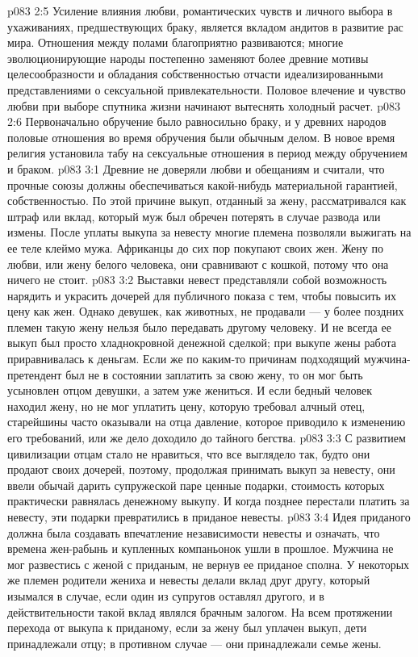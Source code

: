 \vs p083 2:5 Усиление влияния любви, романтических чувств и личного выбора в ухаживаниях, предшествующих браку, является вкладом андитов в развитие рас мира. Отношения между полами благоприятно развиваются; многие эволюционирующие народы постепенно заменяют более древние мотивы целесообразности и обладания собственностью отчасти идеализированными представлениями о сексуальной привлекательности. Половое влечение и чувство любви при выборе спутника жизни начинают вытеснять холодный расчет.
\vs p083 2:6 Первоначально обручение было равносильно браку, и у древних народов половые отношения во время обручения были обычным делом. В новое время религия установила табу на сексуальные отношения в период между обручением и браком.
\vs p083 3:1 Древние не доверяли любви и обещаниям и считали, что прочные союзы должны обеспечиваться какой\hyp{}нибудь материальной гарантией, собственностью. По этой причине выкуп, отданный за жену, рассматривался как штраф или вклад, который муж был обречен потерять в случае развода или измены. После уплаты выкупа за невесту многие племена позволяли выжигать на ее теле клеймо мужа. Африканцы до сих пор покупают своих жен. Жену по любви, или жену белого человека, они сравнивают с кошкой, потому что она ничего не стоит.
\vs p083 3:2 Выставки невест представляли собой возможность нарядить и украсить дочерей для публичного показа с тем, чтобы повысить их цену как жен. Однако девушек, как животных, не продавали --- у более поздних племен такую жену нельзя было передавать другому человеку. И не всегда ее выкуп был просто хладнокровной денежной сделкой; при выкупе жены работа приравнивалась к деньгам. Если же по каким\hyp{}то причинам подходящий мужчина\hyp{}претендент был не в состоянии заплатить за свою жену, то он мог быть усыновлен отцом девушки, а затем уже жениться. И если бедный человек находил жену, но не мог уплатить цену, которую требовал алчный отец, старейшины часто оказывали на отца давление, которое приводило к изменению его требований, или же дело доходило до тайного бегства.
\vs p083 3:3 С развитием цивилизации отцам стало не нравиться, что все выглядело так, будто они продают своих дочерей, поэтому, продолжая принимать выкуп за невесту, они ввели обычай дарить супружеской паре ценные подарки, стоимость которых практически равнялась денежному выкупу. И когда позднее перестали платить за невесту, эти подарки превратились в приданое невесты.
\vs p083 3:4 Идея приданого должна была создавать впечатление независимости невесты и означать, что времена жен\hyp{}рабынь и купленных компаньонок ушли в прошлое. Мужчина не мог развестись с женой с приданым, не вернув ее приданое сполна. У некоторых же племен родители жениха и невесты делали вклад друг другу, который изымался в случае, если один из супругов оставлял другого, и в действительности такой вклад являлся брачным залогом. На всем протяжении перехода от выкупа к приданому, если за жену был уплачен выкуп, дети принадлежали отцу; в противном случае --- они принадлежали семье жены.
